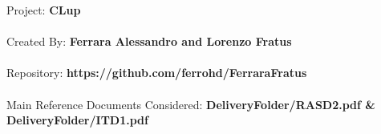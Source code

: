 
Project: \textbf{CLup} \\
\\
Created By: \textbf{Ferrara Alessandro and Lorenzo Fratus} \\
\\
Repository: \textbf{https://github.com/ferrohd/FerraraFratus}\\
\\
Main Reference Documents Considered: \textbf{DeliveryFolder/RASD2.pdf \& DeliveryFolder/ITD1.pdf}
